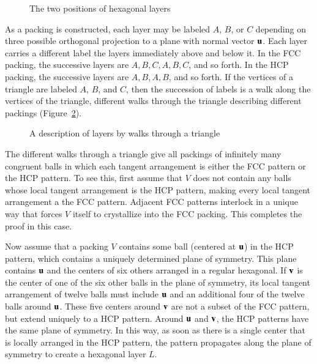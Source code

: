 \begin{figure}[htb]
  \centering
  \caption{The two positions of hexagonal layers}
  \label{fig:two-holes}
\end{figure}

As a packing is constructed, each layer may be labeled
$A$, $B$, or $C$ depending on three possible orthogonal projection to a plane
with normal vector ${\mathbf u}$.
Each layer carries a different label the layers immediately
above and below it.  In the FCC packing, the successive layers are
$A,B,C,A,B,C$, and so forth.  In the HCP packing, the successive layers are
$A,B,A,B$, and so forth.  If the vertices of a triangle are labeled $A$, $B$, and $C$,
then the succession of labels is a
walk along the vertices of the triangle, different walks through the
triangle describing different packings (Figure~\ref{fig:fcc-tri}).

\begin{figure}[htb]
  \centering
  \caption{A description of layers by walks through a triangle}
  \label{fig:fcc-tri}
\end{figure}

The different walks through a triangle give all packings of infinitely
many congruent balls in which each tangent arrangement is
either the FCC pattern  or the HCP pattern.  To see
this, first assume that $V$ does not contain any balls whose local
tangent arrangement is the HCP pattern, making every local tangent
arrangement a the FCC pattern.  Adjacent FCC patterns interlock in a unique way
that forces $V$ itself to crystallize into the
FCC packing.  This completes the proof in this case.

Now assume that a packing $V$ contains some ball (centered at ${\mathbf u}$)
in the HCP pattern, which contains a uniquely determined
plane of symmetry. This plane contains ${\mathbf u}$ and the centers of six
others arranged in a regular hexagonal. If ${\mathbf v}$ is the center of one of
the six other balls in the plane of symmetry, its local tangent arrangement
of twelve balls must include ${\mathbf u}$ and an additional four of the
twelve balls around ${\mathbf u}$. These five centers around ${\mathbf v}$ are not a
subset of the FCC pattern, but  extend uniquely to
a HCP pattern.   Around ${\mathbf u}$ and ${\mathbf v}$, the HCP patterns  have the same
plane of symmetry. In this way, as
soon as there is a single center that is locally arranged in the HCP pattern, the pattern
propagates along the plane of symmetry to create a hexagonal layer
$L$.

